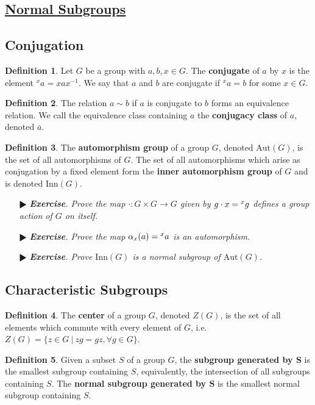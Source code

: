 \documentclass[11pt]{amsart}
\theoremstyle{definition}
\newtheorem*{definition*}{Definition}
\renewcommand\:{\colon}
\renewcommand\bar[1]{\overline{#1}}
\newcommand{\1}{\mathds{1}}
\newcommand{\Aut}{\text{Aut}}
\newcommand{\Inn}{\text{Inn}}
\newcommand{\exc}[1]{\vspace{-2.5pt}\begin{itemize}[leftmargin=15pt]\item[$\RHD$] \textit{\textbf{Exercise}. #1}\end{itemize}}
\begin{document}
\subsection*{\underline{Normal Subgroups}}

\subsection*{Conjugation}

\begin{definition*}
	Let $G$ be a group with $a, b, x \in G$. The \textbf{conjugate} of $a$ by $x$ is the element $^xa = xax^{-1}$. We say that $a$ and $b$ are conjugate if $^xa = b$ for some $x \in G$.
\end{definition*}

\begin{definition*}
	The relation $a \sim b$ if $a$ is conjugate to $b$ forms an equivalence relation. We call the equivalence class containing $a$ the \textbf{conjugacy class} of $a$, denoted $\bar{a}$.
\end{definition*}

\begin{definition*}
	The \textbf{automorphism group} of a group $G$, denoted $\Aut(G)$, is the set of all automorphisms of $G$. The set of all automorphisms which arise as conjugation by a fixed element form the \textbf{inner automorphism group} of $G$ and is denoted $\Inn(G)$.
\end{definition*}

\exc{Prove the map $\cdot \: G \times G \to G$ given by $g \cdot x = \null^xg$ defines a group action of $G$ on itself.}
\exc{Prove the map $\alpha_x(a) = \null^xa$ is an automorphism.}
\exc{Prove $\Inn(G)$ is a normal subgroup of $\Aut(G)$.}
\vskip20pt

\subsection*{Characteristic Subgroups}

\begin{definition*}
	The \textbf{center} of a group $G$, denoted $Z(G)$, is the set of all elements which commute with every element of $G$, i.e. $Z(G) = \{ z \in G \ | \ zg = gz, \forall g \in G\}$.
\end{definition*}

\begin{definition*}
	Given a subset $S$ of a group $G$, the \textbf{subgroup generated by $\boldsymbol{S}$} is the smallest subgroup containing $S$, equivalently, the intersection of all subgroups containing $S$. The \textbf{normal subgroup generated by $\boldsymbol{S}$} is the smallest normal subgroup containing $S$.
\end{definition*}
\end{document}
